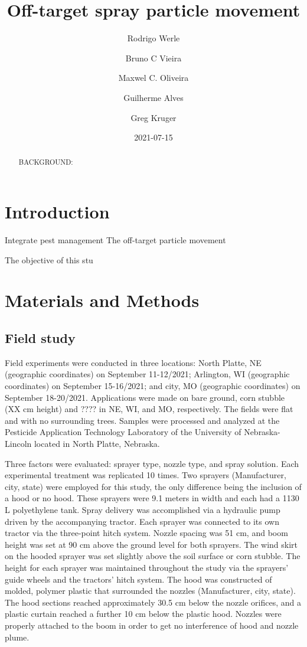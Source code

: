 \documentclass[
  12pt,
  a4paper,
]{article}
\title{Off-target spray particle movement}
\author{Rodrigo Werle \and Bruno C Vieira \and Maxwel C.
Oliveira \and Guilherme Alves \and Greg Kruger}
\date{2021-07-15}
\begin{document}
\maketitle
\begin{abstract}
BACKGROUND:
\end{abstract}

\hypertarget{introduction}{%
\section{Introduction}\label{introduction}}

Integrate pest management The off-target particle movement

The objective of this stu

\hypertarget{materials-and-methods}{%
\section{Materials and Methods}\label{materials-and-methods}}

\hypertarget{field-study}{%
\subsection{Field study}\label{field-study}}

Field experiments were conducted in three locations: North Platte, NE
(geographic coordinates) on September 11-12/2021; Arlington, WI
(geographic coordinates) on September 15-16/2021; and city, MO
(geographic coordinates) on September 18-20/2021. Applications were made
on bare ground, corn stubble (XX cm height) and ???? in NE, WI, and MO,
respectively. The fields were flat and with no surrounding trees.
Samples were processed and analyzed at the Pesticide Application
Technology Laboratory of the University of Nebraska-Lincoln located in
North Platte, Nebraska.

Three factors were evaluated: sprayer type, nozzle type, and spray
solution. Each experimental treatment was replicated 10 times. Two
sprayers (Manufacturer, city, state) were employed for this study, the
only difference being the inclusion of a hood or no hood. These sprayers
were 9.1 meters in width and each had a 1130 L polyethylene tank. Spray
delivery was accomplished via a hydraulic pump driven by the
accompanying tractor. Each sprayer was connected to its own tractor via
the three-point hitch system. Nozzle spacing was 51 cm, and boom height
was set at 90 cm above the ground level for both sprayers. The wind
skirt on the hooded sprayer was set slightly above the soil surface or
corn stubble. The height for each sprayer was maintained throughout the
study via the sprayers' guide wheels and the tractors' hitch system. The
hood was constructed of molded, polymer plastic that surrounded the
nozzles (Manufacturer, city, state). The hood sections reached
approximately 30.5 cm below the nozzle orifices, and a plastic curtain
reached a further 10 cm below the plastic hood. Nozzles were properly
attached to the boom in order to get no interference of hood and nozzle
plume.
\end{document}
